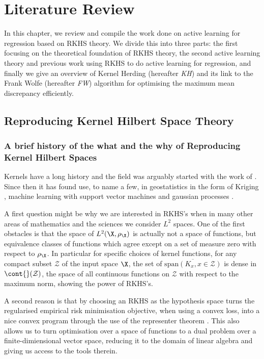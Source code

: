 \chapter{Literature Review}
\label{ch:lit_rev}

In this chapter, we review and compile the work done on active learning for
regression based on RKHS theory. We divide this into three parts: the first
focusing on the theoretical foundation of RKHS theory, the second active
learning theory and previous work using RKHS to do active learning for
regression, and finally we give an overview of Kernel Herding (hereafter
\textit{KH}) and its link to the Frank Wolfe (hereafter \textit{FW}) algorithm
for optimising the maximum mean discrepancy efficiently.

\section{Reproducing Kernel Hilbert Space Theory}
\label{sec:rkhs-theory}

\subsection{A brief history of the what and the why of Reproducing Kernel
Hilbert Spaces}
\label{sec:a-brief-hisory-RKHS} Kernels have a long history and the field was
arguably started with the work of \cite{aronszajn50_theor_reprod_kernel}. Since
then it has found use, to name a few, in geostatistics in the form of Kriging
\cite{cressie90_origin_krigin}, machine learning with support vector machines
\cite{evgeniou99_suppor} and gaussian processes \cite{williams96_gauss}.

A first question might be why we are interested in RKHS's when in many other
areas of mathematics and the sciences we consider \(L^{2}\) spaces. One of the
first obstacles is that the space of \(L^{2}(\X, \rho_{\X})\) is actually not a
space of functions, but equivalence classes of functions which agree except on a
set of measure zero with respect to \(\rho_{\X}\). In particular for specific
choices of kernel functions, for any compact subset \(\mathcal{Z}\) of the input
space \(\X\), the set of \(\overline{\textrm{span}(K_x, x \in \mathcal{Z})}\) is
dense in \(\cont{}(\mathcal{Z})\), the space of all continuous functions on
\(\mathcal{Z}\) with respect to the maximum norm, showing the power of RKHS's.

A second reason is that by choosing an RKHS as the hypothesis space turns the
regularised empirical risk minimisation objective, when using a convex loss,
into a nice convex program through the use of the representer theorem
\cite["Large" Reproducing Kernel Hilbert
Spaces]{gretton18_advan_topic_machin_learn}. This also allows us to turn
optimisation over a space of functions to a dual problem over a
finite-dimiensional vector space, reducing it to the domain of linear algebra
and giving us access to the tools therein.

